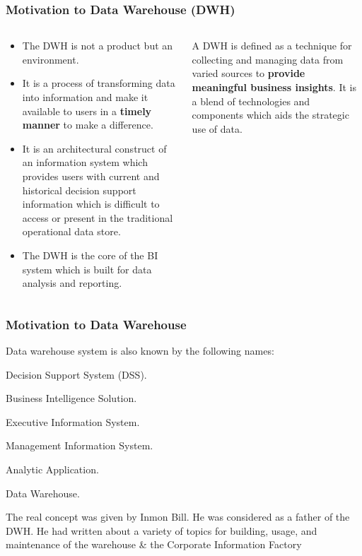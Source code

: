 \begin{frame}
\frametitle{Motivation to Data Warehouse (DWH)}
\begin{columns}[T] %

\begin{column}{.58\textwidth}
\begin{itemize}
\item The DWH is not a product but an environment.
\item It is a process of transforming data into information and make it available to users in a \textbf{timely manner} to make a difference.
\item It is an architectural construct of an information system which provides users with current and historical decision support information which is difficult to access or present in the traditional operational data store.
\item The DWH is the core of the BI system which is built for data analysis and reporting.
\end{itemize}

\end{column}%
\hfill%
\begin{column}{.38\textwidth}
\begin{definition} A DWH is defined as a technique for collecting and managing data from varied sources to \textbf{provide meaningful business insights}. It is a blend of technologies and components which aids the strategic use of data.%
\end{definition}

\end{column}%
\end{columns}

\end{frame}

\begin{frame}
\frametitle{Motivation to Data Warehouse}

Data warehouse system is also known by the following names:


\begin{wideitemize}
\item Decision Support System (DSS).
\item Business Intelligence Solution.
\item Executive Information System.
\item Management Information System.
\item Analytic Application.
\item Data Warehouse.

\end{wideitemize}

The real concept was given by Inmon Bill. He was considered as a father of the DWH. He had written about a variety of topics for building, usage, and maintenance of the warehouse \& the Corporate Information Factory

\end{frame}

